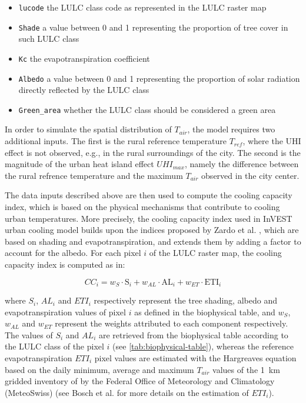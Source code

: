 \documentclass[12pt]{iopart}
\begin{document}
\begin{itemize}
\item \texttt{lucode} the LULC class code as represented in the LULC raster map
\item \texttt{Shade} a value between 0 and 1 representing the proportion of tree cover in such LULC class
\item \texttt{Kc} the evapotranspiration coefficient
\item \texttt{Albedo} a value between 0 and 1 representing the proportion of solar radiation directly reflected by the LULC class
\item \texttt{Green\_area} whether the LULC class should be considered a green area
\end{itemize}

In order to simulate the spatial distribution of $T_{air}$, the model requires two additional inputs. The first is the rural reference temperature $T_{ref}$, where the UHI effect is not observed, e.g., in the rural surroundings of the city. The second is the magnitude of the urban heat island effect $UHI_{max}$, namely the difference between the rural refrence temperature and the maximum $T_{air}$ observed in the city center.

The data inputs described above are then used to compute the cooling capacity index, which is based on the physical mechanisms that contribute to cooling urban temperatures. More precisely, the cooling capacity index used in InVEST urban cooling model builds upon the indices proposed by Zardo et al. \cite{zardo2017estimating}, which are based on shading and evapotranspiration, and extends them by adding a factor to account for the albedo.
For each pixel $i$ of the LULC raster map, the cooling capacity index is computed as in:

\begin{equation}
  \label{eq:cooling-capacity}
  CC_i = w_{S} \cdot \textrm{S}_i + w_{AL} \cdot \textrm{AL}_i + w_{ET} \cdot \textrm{ETI}_i
\end{equation}

where $S_i$, $AL_i$ and $ETI_i$ respectively represent the tree shading, albedo and evapotranspiration values of pixel $i$ as defined in the biophysical table, and $w_{S}$, $w_{AL}$ and $w_{ET}$ represent the weights attributed to each component respectively.
The values of $S_i$ and $AL_i$ are retrieved from the biophysical table according to the LULC class of the pixel $i$ (see \autoref{tab:biophysical-table}), whereas the reference evapotranspiration $ETI_i$ pixel values are estimated with the Hargreaves equation \cite{hargreaves1985reference} based on the daily minimum, average and maximum $T_{air}$ values of the 1~km gridded inventory of by the Federal Office of Meteorology and Climatology (MeteoSwiss) \cite{frei2014interpolation} (see Bosch et al. \cite{bosch2020spatially} for more details on the estimation of $ETI_i$).
\end{document}
